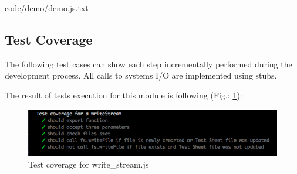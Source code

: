 {
{code/demo/demo.js.txt}

%

\subsection{Test Coverage}
The following test cases can show each step incrementally performed during the development process. All calls to systems I/O are implemented using stubs.
%


The result of tests execution  for this module is following (Fig.: \ref{fig:testWrite}): 
\begin{figure}[H]
	\centering
	\includegraphics[width=\linewidth]{grafiken/testWriteStream.png}
	\caption{Test coverage for write\_stream.js}
	\label{fig:testWrite}
\end{figure}

}
